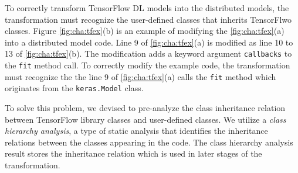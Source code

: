 To correctly transform TensorFlow DL models into the distributed models,
the transformation must recognize the user-defined classes that inherits
TensorFlwo classes.
Figure \ref{fig:cha:tfex}(b) is an example of modifying the \ref{fig:cha:tfex}(a)
into a distributed model code.
Line 9 of \ref{fig:cha:tfex}(a) is modified as line 10 to 13 of 
\ref{fig:cha:tfex}(b). The modification adds a keyword argument {\tt callbacks}
to the {\tt fit} method call. 
To correctly modify the example code, the transformation must recognize the 
the line 9 of \ref{fig:cha:tfex}(a) calls the {\tt fit} method which originates
from the {\tt keras.Model} class.


To solve this problem, we devised to pre-analyze the class inheritance
relation between TensorFlow library classes and user-defined classes. 
We utilize a \textit{class hierarchy analysis}, a type of static analysis
that identifies the inheritance relations between the classes appearing
in the code.
The class hierarchy analysis result stores the inheritance relation
which is used in later stages of the transformation.

